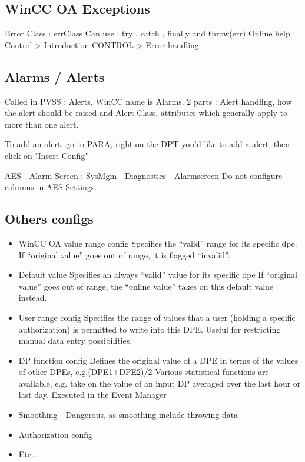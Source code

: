\documentclass[a4paper, 10pt]{article}
\begin{document}
\subsection{WinCC OA Exceptions}
Error Class : errClass
Can use : try { }, catch { }, finally { } and throw(err)
Online help : Control > Introduction CONTROL > Error handling

\subsection{Alarms / Alerts}
Called in PVSS : Alerts. WinCC name is Alarms.
2 parts : Alert handling, how the alert should be raised and Alert Class, attributes which generally apply to more than one alert.

To add an alert, go to PARA, right on the DPT you'd like to add a alert, then click on "Insert Config"

AES - Alarm Screen : SysMgm - Diagnostics - Alarmscreen
Do not configure columns in AES Settings.

\subsection{Others configs}
\begin{itemize}
    \item WinCC OA value range config
Specifies the “valid” range for its specific dpe.
If “original value” goes out of range, it is flagged “invalid”. 
    \item Default value
Specifies an always “valid” value for its specific dpe
If “original value” goes out of range, the “online value” takes on this default value instead.
    \item User range config
Specifies the range of values that a user (holding a specific authorization) is permitted to
write into this DPE. Useful for restricting manual data entry possibilities.
    \item DP function config
Defines the original value of a DPE in terms of the values of other DPEs, e.g.(DPE1+DPE2)/2
Various statistical functions are available, e.g. take on the value of an input DP averaged over the last hour or last day. Executed in the Event Manager
    \item Smoothing - Dangerous, as smoothing include throwing data
    \item Authorization config
    \item Etc...
\end{itemize}
\end{document}

